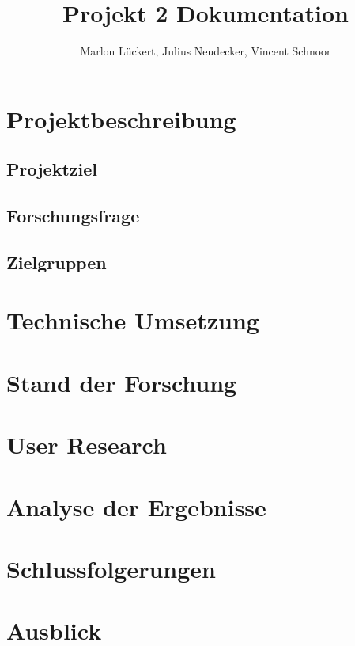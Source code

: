 \documentclass[12pt,a4paper]{article}
\author{Marlon Lückert, Julius Neudecker, Vincent Schnoor}
\title{
Projekt 2 Dokumentation
}
\begin{document}
\maketitle
\section{Projektbeschreibung}
\subsection{Projektziel}
\subsection{Forschungsfrage}
\subsection{Zielgruppen}
\section{Technische Umsetzung}
\section{Stand der Forschung}
\section{User Research}
\section{Analyse der Ergebnisse}
\section{Schlussfolgerungen}
\section{Ausblick}
\end{document}
